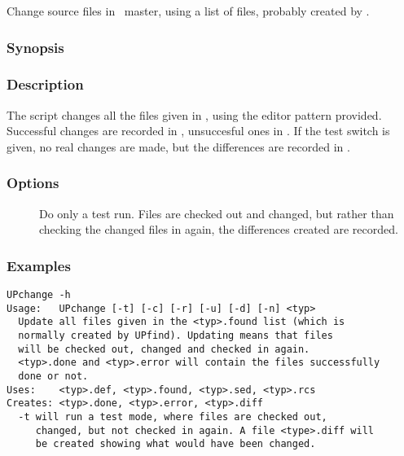 Change source files in \aipspp\ master, using a list of files, probably
created by .

\subsubsection*{Synopsis}

\begin{synopsis}
\end{synopsis}

\subsubsection*{Description}

\noindent
The  script changes all the files given in ,
using the editor pattern provided. Successful changes are recorded in
, unsuccesful ones in . If the 
test switch is given, no real changes are made, but the differences are
recorded in .

\subsubsection*{Options}

\begin{description}
\item[]
    Do only a test run. Files are checked out and changed, but rather than
    checking the changed files in again, the differences created are recorded.
\end{description}

\subsubsection*{Examples}

\begin{verbatim}
UPchange -h
Usage:   UPchange [-t] [-c] [-r] [-u] [-d] [-n] <typ>
  Update all files given in the <typ>.found list (which is
  normally created by UPfind). Updating means that files
  will be checked out, changed and checked in again.
  <typ>.done and <typ>.error will contain the files successfully
  done or not.
Uses:    <typ>.def, <typ>.found, <typ>.sed, <typ>.rcs
Creates: <typ>.done, <typ>.error, <typ>.diff
  -t will run a test mode, where files are checked out,
     changed, but not checked in again. A file <type>.diff will
     be created showing what would have been changed.
\end{verbatim}

